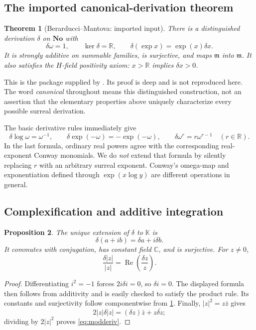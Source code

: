 \documentclass[11pt,letterpaper]{article}
\numberwithin{equation}{section}
\newtheorem{theorem}{Theorem}[section]
\newtheorem{proposition}[theorem]{Proposition}
\theoremstyle{definition}
\theoremstyle{remark}
\newcommand{\No}{\mathbf{No}}
\newcommand{\K}{\mathbb K}
\newcommand{\R}{\mathbb R}
\newcommand{\C}{\mathbb C}
\newcommand{\mm}{\mathfrak m}
\newcommand{\re}{\operatorname{Re}}
\begin{document}
\subsection{The imported canonical-derivation theorem}\label{sec:BMinput}
\begin{theorem}[Berarducci--Mantova: imported input]\label{thm:BM}
There is a distinguished derivation $\delta$ on $\No$ with
\[
 \delta\omega=1,\qquad \ker\delta=\R,\qquad
 \delta(\exp x)=\exp(x)\delta x.
\]
It is strongly additive on summable families, is surjective, and maps $\mm$ into $\mm$. It also satisfies the $H$-field positivity axiom: $x>\R$ implies $\delta x>0$.
\end{theorem}
This is the package supplied by \cite[Theorems A/6.30 and B/7.7]{BM}. Its proof is deep and is not reproduced here. The word \emph{canonical} throughout means this distinguished construction, not an assertion that the elementary properties above uniquely characterize every possible surreal derivation.

The basic derivative rules immediately give
\begin{equation}\label{eq:basic}
 \delta\log\omega=\omega^{-1},\qquad
 \delta\exp(-\omega)=-\exp(-\omega),\qquad
 \delta\omega^r=r\omega^{r-1}\quad(r\in\R).
\end{equation}
In the last formula, ordinary real powers agree with the corresponding real-exponent Conway monomials. We do \emph{not} extend that formula by silently replacing $r$ with an arbitrary surreal exponent. Conway's omega-map and exponentiation defined through $\exp(x\log y)$ are different operations in general.

\subsection{Complexification and additive integration}
\begin{proposition}\label{prop:complexification}
The unique extension of $\delta$ to $\K$ is
\[
 \delta(a+ib)=\delta a+i\delta b.
\]
It commutes with conjugation, has constant field $\C$, and is surjective. For $z\ne0$,
\begin{equation}\label{eq:modderiv}
 \frac{\delta|z|}{|z|}=\re\left(\frac{\delta z}{z}\right).
\end{equation}
\end{proposition}
\begin{proof}
Differentiating $i^2=-1$ forces $2i\delta i=0$, so $\delta i=0$. The displayed formula then follows from additivity and is easily checked to satisfy the product rule. Its constants and surjectivity follow componentwise from \cref{thm:BM}. Finally, $|z|^2=z\bar z$ gives
\[
 2|z|\delta|z|=(\delta z)\bar z+z\overline{\delta z};
\]
dividing by $2|z|^2$ proves \eqref{eq:modderiv}.
\end{proof}
\end{document}
